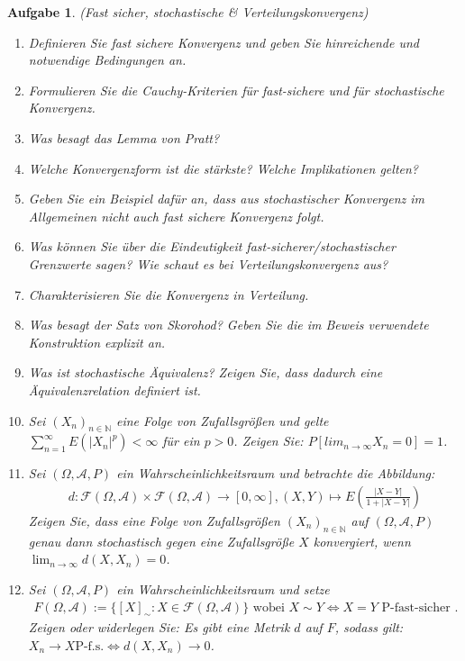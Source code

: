 \documentclass[11pt, a4paper, ngerman]{article}
\newcommand{\N}{\mathbb{N}}
\newtheorem{aufgabe}{Aufgabe}
\begin{document}
\begin{aufgabe} (Fast sicher, stochastische \& Verteilungskonvergenz)
    \begin{enumerate}
        \item 
        Definieren Sie fast sichere Konvergenz und geben Sie hinreichende und notwendige Bedingungen an. 
        \item 
        Formulieren Sie die Cauchy-Kriterien für fast-sichere und für stochastische Konvergenz. 
        \item
        Was besagt das Lemma von Pratt? 
        \item 
        Welche Konvergenzform ist die stärkste? Welche Implikationen gelten?  
        \item 
        Geben Sie ein Beispiel dafür an, dass aus stochastischer Konvergenz im Allgemeinen nicht auch fast sichere Konvergenz folgt. 
        \item 
        Was können Sie über die Eindeutigkeit fast-sicherer/stochastischer Grenzwerte sagen? Wie schaut es bei Verteilungskonvergenz aus?
        \item
        Charakterisieren Sie die Konvergenz in Verteilung. 
        \item 
        Was besagt der Satz von Skorohod? Geben Sie die im Beweis verwendete Konstruktion explizit an. 
        \item 
        Was ist stochastische Äquivalenz? Zeigen Sie, dass dadurch eine Äquivalenzrelation definiert ist. 
        \item 
        Sei $(X_n)_{n \in \N}$ eine Folge von Zufallsgrößen und gelte $\sum_{n=1}^{\infty}E(\lvert X_n\rvert^p) < \infty$ für ein $p > 0$. Zeigen Sie: $P[lim_{n \to \infty} X_n = 0] = 1$. 
        \item 
        Sei $(\Omega, \mathcal{A}, P)$ ein Wahrscheinlichkeitsraum und betrachte die Abbildung:
        \begin{align*}
            d : \mathcal{F}(\Omega, \mathcal{A}) \times \mathcal{F}(\Omega, \mathcal{A}) \to [0, \infty], (X,Y) \mapsto E(\frac{\lvert X - Y \rvert}{1 + \lvert X - Y \rvert})
        \end{align*}
        Zeigen Sie, dass eine Folge von Zufallsgrößen $(X_n)_{n \in \N}$ auf $(\Omega, \mathcal{A}, P)$ genau dann stochastisch gegen eine Zufallsgröße $X$ konvergiert, wenn $\lim_{n \to \infty}d(X, X_n) = 0$. 
        \item
        Sei $(\Omega, \mathcal{A}, P)$ ein Wahrscheinlichkeitsraum und setze 
        \begin{align*}
            F(\Omega, \mathcal{A}) := \{ [X]_{\sim} : X \in \mathcal{F}(\Omega, \mathcal{A})\} \text{ wobei } X \sim Y \iff X = Y \text{ P-fast-sicher }. 
        \end{align*}  
        Zeigen oder widerlegen Sie: Es gibt eine Metrik $d$ auf $F$, sodass gilt: $X_n \to X \text{P-f.s.} \iff d(X,X_n) \to 0$. 
      
        \end{enumerate}
\end{aufgabe}
\end{document}

